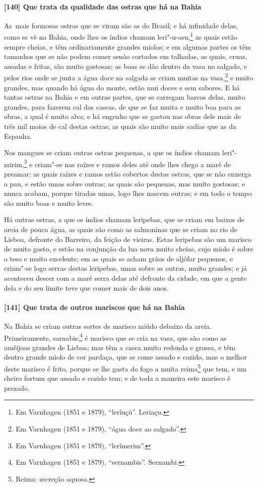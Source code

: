 \begin{linenumbers}
\paragraph{[140] Que trata da qualidade das ostras que há na Bahia}\quad
\mbox{As mais} formosas ostras que se viram são as do Brasil; e há infinidade delas, como se vê
na Bahia, onde lhes os índios chamam leri"-u-asu,\footnote{ Em Varnhagen (1851 e 1879),
``lerîuçú''. Leriaçu.} as quais estão sempre cheias, e têm ordinariamente grandes miolos;
e em algumas partes os têm tamanhos que se não podem comer senão cortados em talhadas, as
quais, cruas, assadas e fritas, são muito gostosas; as boas se dão dentro da vasa no
salgado, e pelos rios onde se junta a água doce na salgada se criam muitas na
vasa,\footnote{ Em Varnhagen (1851 e 1879), ``água doce ao salgado''.} e muito grandes,
mas quando há água do monte, estão mui doces e sem sabores. E há tantas ostras na Bahia e
em outras partes, que se carregam barcos delas, muito grandes, para fazerem cal das
cascas, de que se faz muita e muito boa para as obras, a qual é muito alva; e há engenho
que se gastou nas obras dele mais de três mil moios de cal destas ostras; as quais são
muito mais sadias que as da Espanha.

Nos mangues se criam outras ostras pequenas, a que os índios chamam leri"-mirim,\footnote{
Em Varnhagen (1851 e 1879), ``lerîmerim''.} e criam"-se nas raízes e ramos deles até onde
lhes chega a maré de preamar; as quais raízes e ramos estão cobertos destas ostras, que se
não enxerga o pau, e estão umas sobre outras; as quais são pequenas, mas muito gostosas; e
nunca acabam, porque tiradas umas, logo lhes nascem outras; e em todo o tempo são muito
boas e muito leves.

Há outras ostras, a que os índios chamam leripebas, que se criam em baixos de areia de
pouca água, as quais são como as salmoninas que se criam no rio de Lisboa, defronte do
Barreiro, da feição de vieiras. Estas leripebas são um marisco de muito gosto, e estão na
conjunção da lua nova muito cheias, cujo miolo é sobre o teso e muito excelente; em as
quais se acham grãos de aljôfar pequenos, e criam"-se logo serras destas leripebas, umas
sobre as outras, muito grandes; e já aconteceu descer com a maré serra delas até defronte
da cidade, em que a gente dela e do seu limite teve que comer mais de dois anos.

\paragraph{[141] Que trata de outros mariscos que há na Bahia}\quad
Na Bahia se criam outras sortes de marisco miúdo debaixo da areia. Primeiramente,
sarnabis;\footnote{ Em Varnhagen (1851 e 1879), ``sernambis''. Sernambi.} é marisco que se
cria na vasa, que são como as amêijoas grandes de Lisboa; mas têm a casca muito redonda e
grossa, e têm dentro grande miolo de cor pardaça, que se come assado e cozido, mas o
melhor deste marisco é frito, porque se lhe gasta do fogo a muita reima\footnote{ Reima:
secreção aquosa.} que tem, e um cheiro fortum que assado e cozido tem; e de
toda a maneira este marisco é prezado.


\end{linenumbers}
